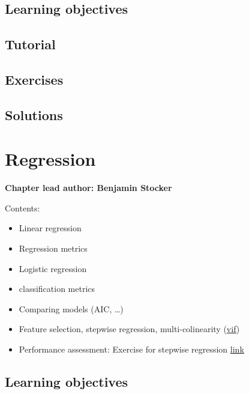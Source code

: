 \documentclass[
]{book}
\providecommand{\tightlist}{%
  \setlength{\itemsep}{0pt}\setlength{\parskip}{0pt}}
\begin{document}
\hypertarget{learning-objectives-6}{%
\section{Learning objectives}\label{learning-objectives-6}}

\hypertarget{tutorial-6}{%
\section{Tutorial}\label{tutorial-6}}

\hypertarget{exercises-6}{%
\section{Exercises}\label{exercises-6}}

\hypertarget{solutions-6}{%
\section{Solutions}\label{solutions-6}}

\hypertarget{regression}{%
\chapter{Regression}\label{regression}}

\textbf{Chapter lead author: Benjamin Stocker}

Contents:

\begin{itemize}
\tightlist
\item
  Linear regression
\item
  Regression metrics
\item
  Logistic regression
\item
  classification metrics
\item
  Comparing models (AIC, \ldots)
\item
  Feature selection, stepwise regression, multi-colinearity (\href{http://www.sthda.com/english/articles/39-regression-model-diagnostics/160-multicollinearity-essentials-and-vif-in-r/}{vif})
\item
  Performance assessment: Exercise for stepwise regression \href{https://stineb.github.io/esds_book/ch-08.html}{link}
\end{itemize}

\hypertarget{learning-objectives-7}{%
\section{Learning objectives}\label{learning-objectives-7}}
\end{document}
